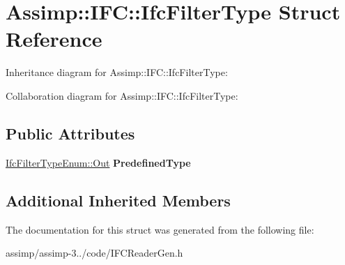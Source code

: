 \hypertarget{struct_assimp_1_1_i_f_c_1_1_ifc_filter_type}{\section{Assimp\+:\+:I\+F\+C\+:\+:Ifc\+Filter\+Type Struct Reference}
\label{struct_assimp_1_1_i_f_c_1_1_ifc_filter_type}
}


Inheritance diagram for Assimp\+:\+:I\+F\+C\+:\+:Ifc\+Filter\+Type\+:


Collaboration diagram for Assimp\+:\+:I\+F\+C\+:\+:Ifc\+Filter\+Type\+:
\subsection*{Public Attributes}
\begin{DoxyCompactItemize}
\item 
\hypertarget{struct_assimp_1_1_i_f_c_1_1_ifc_filter_type_a1f98e950c19762a3cc9294f947b9c51a}{\hyperlink{classboost_1_1shared__ptr}{Ifc\+Filter\+Type\+Enum\+::\+Out} {\bfseries Predefined\+Type}}\label{struct_assimp_1_1_i_f_c_1_1_ifc_filter_type_a1f98e950c19762a3cc9294f947b9c51a}

\end{DoxyCompactItemize}
\subsection*{Additional Inherited Members}


The documentation for this struct was generated from the following file\+:\begin{DoxyCompactItemize}
\item 
assimp/assimp-\/3../code/I\+F\+C\+Reader\+Gen.\+h\end{DoxyCompactItemize}
